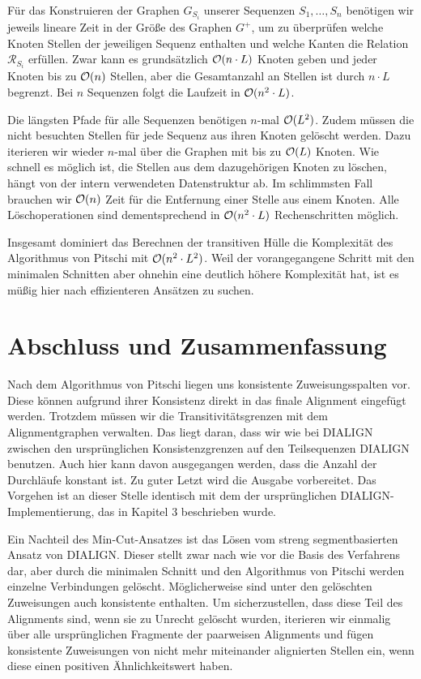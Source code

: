 Für das Konstruieren der Graphen $G_{S_i}$ unserer Sequenzen $S_1, \dots, S_n$ benötigen wir jeweils lineare Zeit in der Größe des Graphen $G^{+}$, um zu überprüfen welche Knoten Stellen der jeweiligen Sequenz enthalten und welche Kanten die Relation $\mathcal{R}_{S_i}$ erfüllen. Zwar kann es grundsätzlich $\mathcal{O}(n\cdot L)$ Knoten geben und jeder Knoten bis zu $\mathcal{O}(n)$ Stellen, aber die Gesamtanzahl an Stellen ist durch $n\cdot L$ begrenzt. Bei $n$ Sequenzen folgt die Laufzeit in $\mathcal{O}(n^2\cdot L)$.

Die längsten Pfade für alle Sequenzen benötigen $n$-mal $\mathcal{O}(L^2)$. Zudem müssen die nicht besuchten Stellen für jede Sequenz aus ihren Knoten gelöscht werden. Dazu iterieren wir wieder $n$-mal über die Graphen mit bis zu $\mathcal{O}(L)$ Knoten. Wie schnell es möglich ist, die Stellen aus dem dazugehörigen Knoten zu löschen, hängt von der intern verwendeten Datenstruktur ab. Im schlimmsten Fall brauchen wir $\mathcal{O}(n)$ Zeit für die Entfernung einer Stelle aus einem Knoten. Alle Löschoperationen sind dementsprechend in $\mathcal{O}(n^2\cdot L)$ Rechenschritten möglich.

Insgesamt dominiert das Berechnen der transitiven Hülle die Komplexität des Algorithmus von Pitschi mit $\mathcal{O}(n^2\cdot L^2)$. Weil der vorangegangene Schritt mit den minimalen Schnitten aber ohnehin eine deutlich höhere Komplexität hat, ist es müßig hier nach effizienteren Ansätzen zu suchen. 

\section{Abschluss und Zusammenfassung}

Nach dem Algorithmus von Pitschi liegen uns konsistente Zuweisungsspalten vor. Diese können aufgrund ihrer Konsistenz direkt in das finale Alignment eingefügt werden. Trotzdem müssen wir die Transitivitätsgrenzen mit dem Alignmentgraphen verwalten. Das liegt daran, dass wir wie bei DIALIGN zwischen den ursprünglichen Konsistenzgrenzen auf den Teilsequenzen DIALIGN benutzen. Auch hier kann davon ausgegangen werden, dass die Anzahl der Durchläufe konstant ist. Zu guter Letzt wird die Ausgabe vorbereitet. Das Vorgehen ist an dieser Stelle identisch mit dem der ursprünglichen DIALIGN-Implementierung, das in Kapitel 3 beschrieben wurde.

Ein Nachteil des Min-Cut-Ansatzes ist das Lösen vom streng segmentbasierten Ansatz von DIALIGN. Dieser stellt zwar nach wie vor die Basis des Verfahrens dar, aber durch die minimalen Schnitt und den Algorithmus von Pitschi werden einzelne Verbindungen gelöscht. Möglicherweise sind unter den gelöschten Zuweisungen auch konsistente enthalten. Um sicherzustellen, dass diese Teil des Alignments sind, wenn sie zu Unrecht gelöscht wurden, iterieren wir einmalig über alle ursprünglichen Fragmente der paarweisen Alignments und fügen konsistente Zuweisungen von nicht mehr miteinander alignierten Stellen ein, wenn diese einen positiven Ähnlichkeitswert haben. 

